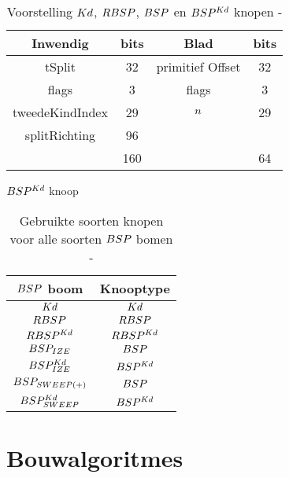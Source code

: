\begin{table}[tb]
        \bigskip
        \begin{subtable}{1\textwidth}
            \centering
            \begin{tabular}{@{}|c|c|c|c|@{}} \toprule      
                Inwendig & bits & Blad & bits \\ \midrule
                tSplit & 32 & primitief Offset & 32 \\
                flags  & 3  &  flags   & 3   \\
                tweedeKindIndex & 29 & $n$ & 29 \\
                splitRichting & 96 &  &  \\ \hline \hline
                & 160 & & 64    \\ \bottomrule
            \end{tabular}
            \caption{$\symBSPKd$ knoop}
            \label{tab:voorstelling-bspkd-knoop}
        \end{subtable}
        \caption[Voorstelling $\symKd$, $\symRBSP$, $\symBSP$ en $\symBSPKd$ knopen]{Voorstelling $\symKd$, $\symRBSP$, $\symBSP$ en $\symBSPKd$ knopen - \small }
    \end{table}                                                                                         

    \begin{table}
        \centering
        \begin{tabular}{@{}|c|c|@{}} \toprule      
        $\symBSP$ boom & Knooptype \\ \midrule
        $\symKd$ & $\symKd$ \\
        $\symRBSP$ & $\symRBSP$  \\
        $RBSP^{Kd}$ & $RBSP^{Kd}$  \\
        $BSP_{IZE}$ &  $\symBSP$ \\
        $BSP^{Kd}_{IZE}$ & $\symBSPKd$ \\
        $BSP_{SWEEP(+)}$ & $\symBSP$ \\
        $BSP^{Kd}_{SWEEP}$ & $\symBSPKd$ \\ \bottomrule
        \end{tabular}
        \caption[Gebruikte soorten knopen voor alle soorten $\symBSP$ bomen]{Gebruikte soorten knopen voor alle soorten $\symBSP$ bomen - \small}
        \label{tab:voorstelling-knoop-boom}
    \end{table}

\section{Bouwalgoritmes}
\label{sec:h4-bouwalgoritmes}


